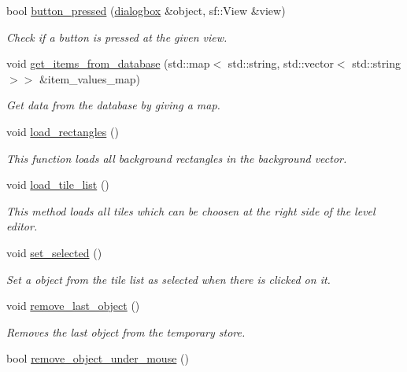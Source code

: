 \begin{DoxyCompactItemize}
\item 
bool \hyperlink{classleveleditor_aefcb8b0819a53d39936400d5c4f4952e}{button\+\_\+pressed} (\hyperlink{classdialogbox}{dialogbox} \&object, sf\+::\+View \&view)
\begin{DoxyCompactList}\small\item\em Check if a button is pressed at the given view. \end{DoxyCompactList}\item 
void \hyperlink{classleveleditor_ace9678fd4d5cdce53584dcc55d4e7c7b}{get\+\_\+items\+\_\+from\+\_\+database} (std\+::map$<$ std\+::string, std\+::vector$<$ std\+::string $>$$>$ \&item\+\_\+values\+\_\+map)
\begin{DoxyCompactList}\small\item\em Get data from the database by giving a map. \end{DoxyCompactList}\item 
void \hyperlink{classleveleditor_a675038d66c5ea045d4e3b922e28a23ec}{load\+\_\+rectangles} ()
\begin{DoxyCompactList}\small\item\em This function loads all background rectangles in the background vector. \end{DoxyCompactList}\item 
void \hyperlink{classleveleditor_ad34dad62ef7c5ea26250b97e9803776a}{load\+\_\+tile\+\_\+list} ()
\begin{DoxyCompactList}\small\item\em This method loads all tiles which can be choosen at the right side of the level editor. \end{DoxyCompactList}\item 
void \hyperlink{classleveleditor_a6579d63ca18e84f7a335bf8072f798cc}{set\+\_\+selected} ()
\begin{DoxyCompactList}\small\item\em Set a object from the tile list as selected when there is clicked on it. \end{DoxyCompactList}\item 
void \hyperlink{classleveleditor_aa2b54b93aa87f704d841f6ccd59b4e38}{remove\+\_\+last\+\_\+object} ()
\begin{DoxyCompactList}\small\item\em Removes the last object from the temporary store. \end{DoxyCompactList}\item 
bool \hyperlink{classleveleditor_a89e3b4fb65aa6db692a2f4db65e6dba2}{remove\+\_\+object\+\_\+under\+\_\+mouse} ()
$$
\end{DoxyCompactItemize}
